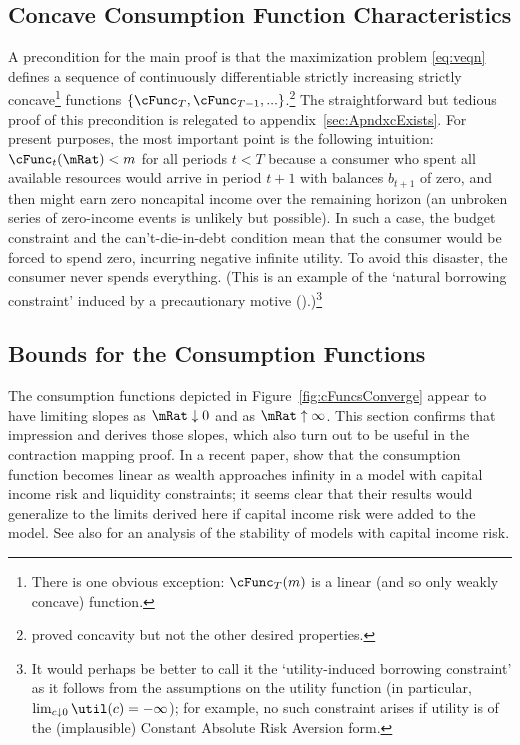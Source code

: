 \documentclass[titlepage]{\econtex}\providecommand{\texname}{BufferStockTheory}
\begin{document}
\hypertarget{Concave-Consumption-Function-Characteristics}{}
\subsection{Concave Consumption Function Characteristics}\label{sec:cExists}

A precondition for the main proof is that the maximization problem \eqref{eq:veqn} defines a sequence of continuously differentiable strictly increasing strictly concave\footnote{There is one obvious exception: $\cFunc_{T}(m)$ is a linear (and so only weakly concave) function.} functions $\{\cFunc_{T},\cFunc_{T-1},...\}$.\footnote{\cite{ckConcavity} proved concavity but not the other desired properties.}  The straightforward but tedious proof of this precondition is relegated to appendix~\ref{sec:ApndxcExists}.  For present purposes, the most important point is the following intuition: $\cFunc_{t}(\mRat) < m$ for all periods $t < T$ because a consumer who spent all available resources would arrive in period $t+1$ with balances $b_{t+1}$ of zero, and then might earn zero noncapital income over the remaining horizon (an unbroken series of zero-income events is unlikely but possible).  In such a case, the budget constraint and the can't-die-in-debt condition mean that the consumer would be forced to spend zero, incurring negative infinite utility.  To avoid this disaster, the consumer never spends everything.  (This is an example of the `natural borrowing constraint' induced by a precautionary motive (\cite{zeldesStochastic}).)\footnote{It would perhaps be better to call it the `utility-induced borrowing constraint' as it follows from the assumptions on the utility function (in particular, $\lim_{c \downarrow 0} \util(c)=-\infty$); for example, no such constraint arises if utility is of the (implausible) Constant Absolute Risk Aversion form.}

\hypertarget{Bounds-for-the-Consumption-Functions}{}
\subsection{Bounds for the Consumption Functions}

The consumption functions depicted in Figure~\ref{fig:cFuncsConverge} appear
to have limiting slopes as $\mRat \downarrow 0$ and as $\mRat \uparrow
\infty$.  This section confirms that impression and derives those
slopes, which also turn out to be useful in the contraction
mapping proof.  In a recent paper, \cite{benhabibWealth} show that the consumption function
becomes linear as wealth approaches infinity in a model with capital income risk and liquidity
constraints; it seems clear that their results would generalize to the limits derived here if capital income risk were added to the model.  See also \cite{mstCapIncFluct} for an analysis of the stability of models with capital income risk.
\end{document}

